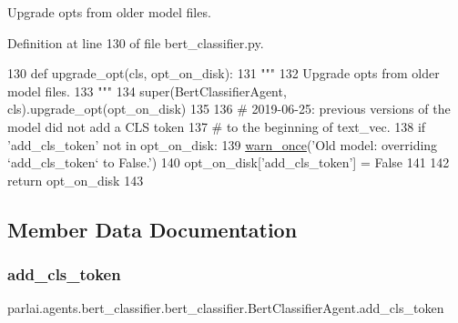 \begin{DoxyVerb}Upgrade opts from older model files.
\end{DoxyVerb}
 

Definition at line 130 of file bert\+\_\+classifier.\+py.


\begin{DoxyCode}
130     \textcolor{keyword}{def }upgrade\_opt(cls, opt\_on\_disk):
131         \textcolor{stringliteral}{"""}
132 \textcolor{stringliteral}{        Upgrade opts from older model files.}
133 \textcolor{stringliteral}{        """}
134         super(BertClassifierAgent, cls).upgrade\_opt(opt\_on\_disk)
135 
136         \textcolor{comment}{# 2019-06-25: previous versions of the model did not add a CLS token}
137         \textcolor{comment}{# to the beginning of text\_vec.}
138         \textcolor{keywordflow}{if} \textcolor{stringliteral}{'add\_cls\_token'} \textcolor{keywordflow}{not} \textcolor{keywordflow}{in} opt\_on\_disk:
139             \hyperlink{namespaceparlai_1_1utils_1_1misc_acf146e70ea7f6867969a7c2b545d4b4b}{warn\_once}(\textcolor{stringliteral}{'Old model: overriding `add\_cls\_token` to False.'})
140             opt\_on\_disk[\textcolor{stringliteral}{'add\_cls\_token'}] = \textcolor{keyword}{False}
141 
142         \textcolor{keywordflow}{return} opt\_on\_disk
143 
\end{DoxyCode}


\subsection{Member Data Documentation}
\mbox{\label{classparlai_1_1agents_1_1bert__classifier_1_1bert__classifier_1_1BertClassifierAgent_a23a9fab5a21c9ee44ab416476b7f0361}} 
\subsubsection{\texorpdfstring{add\+\_\+cls\+\_\+token}{add\_cls\_token}}
{\footnotesize\ttfamily parlai.\+agents.\+bert\+\_\+classifier.\+bert\+\_\+classifier.\+Bert\+Classifier\+Agent.\+add\+\_\+cls\+\_\+token}



